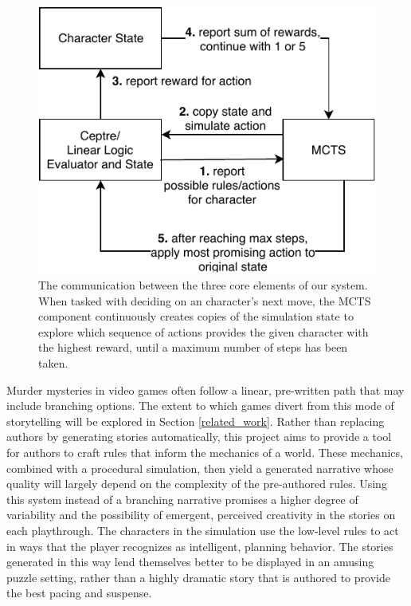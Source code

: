 \begin{figure}
  \includegraphics{mcts-flow.pdf}
  \caption{The communication between the three core elements of our system. When tasked with deciding on an character's next move, the MCTS component continuously creates copies of the simulation state to explore which sequence of actions provides the given character with the highest reward, until a maximum number of steps has been taken.}
  \label{fig:mcts-components}
\end{figure}


Murder mysteries in video games often follow a linear, pre-written path that may include branching options.
The extent to which games divert from this mode of storytelling will be explored in Section \ref{related_work}.
Rather than replacing authors by generating stories automatically, this project aims to provide a tool for authors to craft rules that inform the mechanics of a world.
These mechanics, combined with a procedural simulation, then yield a generated narrative whose quality will largely depend on the complexity of the pre-authored rules.
Using this system instead of a branching narrative promises a higher degree of variability and the possibility of emergent, perceived creativity in the stories on each playthrough.
The characters in the simulation use the low-level rules to act in ways that the player recognizes as intelligent, planning behavior.
The stories generated in this way lend themselves better to be displayed in an amusing puzzle setting, rather than a highly dramatic story that is authored to provide the best pacing and suspense.

